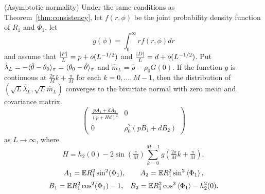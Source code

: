 \documentclass[journal]{IEEEtran}
\begin{document}
\begin{theorem}\label{thm:normality} (Asymptotic normality)
Under the same conditions as Theorem~\ref{thm:consistency}, let $f(r,\phi)$ be the joint probability density function of $R_1$ and $\Phi_1$, let
\[
g(\phi) = \int_{0}^{\infty} r f(r,\phi) dr %
\]
and assume that $\frac{{\left\vert P \right\vert}}{L} = p + o(L^{-1/2})$ and $\frac{{\left\vert D \right\vert}}{L} = d + o(L^{-1/2})$.
Put $\hat{\lambda}_L = -\langle \hat{\theta} - \theta_0 \rangle_\pi = \langle \theta_0 - \hat{\theta} \rangle_\pi$ and $\hat{m}_L = \hat{\rho} - \rho_0 G(0)$. %
If the function $g$ is continuous at $\tfrac{2\pi}{M}k + \tfrac{\pi}{M}$ for each $k = 0, \dots, M-1$, then the distribution of $(\sqrt{L}\hat{\lambda}_L, \sqrt{L}\hat{m}_L)$ converges to the bivariate normal with zero mean and covariance matrix
\[
\left( \begin{array}{cc} 
\frac{pA_1 + dA_2}{(p + H d)^2} & 0 \\
0 & \rho_0^2(pB_1 + dB_2)
\end{array} \right)
\]
as $L \rightarrow \infty$, where
\[
H = h_2(0) -  2 \sin(\tfrac{\pi}{M}) \sum_{k = 0}^{M-1} g(\tfrac{2\pi}{M}k + \tfrac{\pi}{M}),
\]
\[
A_1 = {\mathbb E} R_1^2\sin^2(\Phi_1), \qquad A_2 = {\mathbb E} R_1^2\sin^2\left\langle \Phi_1 \right\rangle,
\]
\[
B_1 = {\mathbb E} R_1^2 \cos^2(\Phi_1) - 1, \;\;\; B_2 = {\mathbb E} R_1^2 \cos^2\left\langle \Phi_1 \right\rangle - h_2^2(0).
\]
\end{theorem}

\end{document}
